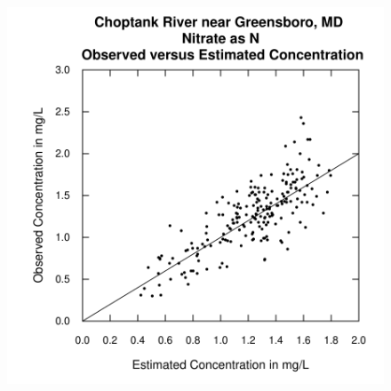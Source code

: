 \documentclass[a4paper,11pt]{article}
\begin{document}
\begin{figure}[htbp]
\begin{minipage}[h]{0.5\linewidth}
\begin{center}
\includegraphics{EGRET-figplotConcPred}
    \label{fig:plotConcPred}
    \end{center}
  \end{minipage}
  \caption{}
  \label{fig:plotFluxTimeDailyANDplotConcPred}
\end{figure}

\end{document}
